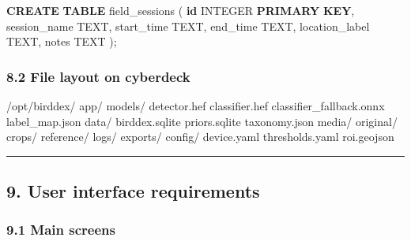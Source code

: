 \documentclass[
  11pt,
]{article}
\newenvironment{Shaded}{}{}
\newcommand{\DataTypeTok}[1]{\textcolor[rgb]{0.56,0.13,0.00}{#1}}
\newcommand{\KeywordTok}[1]{\textcolor[rgb]{0.00,0.44,0.13}{\textbf{#1}}}
\newcommand{\NormalTok}[1]{#1}
\begin{document}
\begin{Shaded}
\begin{Highlighting}[]
\KeywordTok{CREATE} \KeywordTok{TABLE}\NormalTok{ field\_sessions (}
    \KeywordTok{id} \DataTypeTok{INTEGER} \KeywordTok{PRIMARY} \KeywordTok{KEY}\NormalTok{,}
\NormalTok{    session\_name TEXT,}
\NormalTok{    start\_time TEXT,}
\NormalTok{    end\_time TEXT,}
\NormalTok{    location\_label TEXT,}
\NormalTok{    notes TEXT}
\NormalTok{);}
\end{Highlighting}
\end{Shaded}

\subsubsection{8.2 File layout on
cyberdeck}\label{file-layout-on-cyberdeck}

\begin{Shaded}
\begin{Highlighting}[]
\NormalTok{/opt/birddex/}
\NormalTok{  app/}
\NormalTok{  models/}
\NormalTok{    detector.hef}
\NormalTok{    classifier.hef}
\NormalTok{    classifier\_fallback.onnx}
\NormalTok{    label\_map.json}
\NormalTok{  data/}
\NormalTok{    birddex.sqlite}
\NormalTok{    priors.sqlite}
\NormalTok{    taxonomy.json}
\NormalTok{  media/}
\NormalTok{    original/}
\NormalTok{    crops/}
\NormalTok{    reference/}
\NormalTok{  logs/}
\NormalTok{  exports/}
\NormalTok{  config/}
\NormalTok{    device.yaml}
\NormalTok{    thresholds.yaml}
\NormalTok{    roi.geojson}
\end{Highlighting}
\end{Shaded}

\begin{center}\rule{0.5\linewidth}{0.5pt}\end{center}

\subsection{9. User interface
requirements}\label{user-interface-requirements}

\subsubsection{9.1 Main screens}\label{main-screens}
\end{document}
